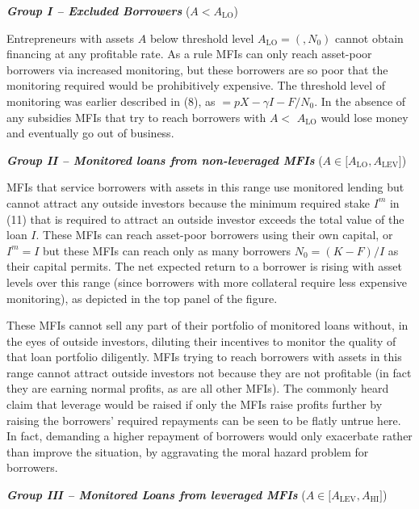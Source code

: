 \documentclass[
]{article}
\begin{document}
\emph{\textbf{{Group I} -- Excluded Borrowers}} (\(A < A_{\text{LO}}\))

Entrepreneurs with assets \(A\) below threshold level
\(A_{\text{LO}} = (,N_{0})\) cannot obtain financing at any profitable
rate. As a rule MFIs can only reach asset-poor borrowers via increased
monitoring, but these borrowers are so poor that the monitoring required
would be prohibitively expensive. The threshold level of monitoring was
earlier described in (8), as \(= pX - \gamma I - F/N_{0}.\) In the
absence of any subsidies MFIs that try to reach borrowers with \(A <\)
\(A_{\text{LO}}\) would lose money and eventually go out of business.

\emph{\textbf{{Group II} -- Monitored loans from non-leveraged MFIs}}
(\(A \in \lbrack A_{\text{LO}},A_{\text{LEV}}\rbrack\))

MFIs that service borrowers with assets in this range use monitored
lending but cannot attract any outside investors because the minimum
required stake \(I^{m}\) in (11) that is required to attract an outside
investor exceeds the total value of the loan \(I\). These MFIs can reach
asset-poor borrowers using their own capital, or \(I^{m} = I\) but these
MFIs can reach only as many borrowers \(N_{0} = (K - F)/I\) as their
capital permits. The net expected return to a borrower is rising with
asset levels over this range (since borrowers with more collateral
require less expensive monitoring), as depicted in the top panel of the
figure.

These MFIs cannot sell any part of their portfolio of monitored loans
without, in the eyes of outside investors, diluting their incentives to
monitor the quality of that loan portfolio diligently. MFIs trying to
reach borrowers with assets in this range cannot attract outside
investors not because they are not profitable (in fact they are earning
normal profits, as are all other MFIs). The commonly heard claim that
leverage would be raised if only the MFIs raise profits further by
raising the borrowers' required repayments can be seen to be flatly
untrue here. In fact, demanding a higher repayment of borrowers would
only exacerbate rather than improve the situation, by aggravating the
moral hazard problem for borrowers.

\emph{\textbf{{Group III} -- Monitored Loans from leveraged MFIs}}
(\(A \in \lbrack A_{\text{LEV}},A_{\text{HI}}\rbrack\))
\end{document}
